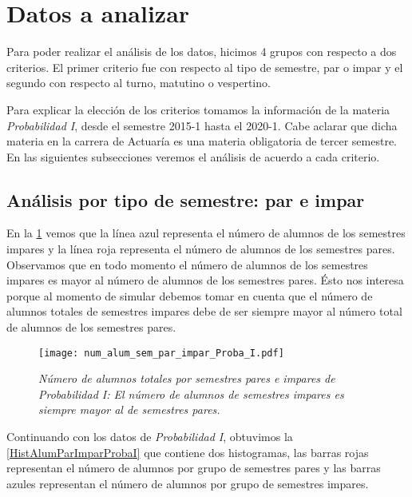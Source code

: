 \section{Datos a analizar} \label{DatosAnalizar}

Para poder realizar el análisis de los datos, hicimos 4 grupos con respecto a dos criterios. El primer criterio fue con respecto al tipo de semestre, par o impar y el segundo con respecto al turno, matutino o vespertino.

Para explicar la elección de los criterios tomamos la información de la materia \textit{Probabilidad I}, desde el semestre 2015-1 hasta el 2020-1. Cabe aclarar que dicha materia en la carrera de Actuaría es una materia obligatoria de tercer semestre. En las siguientes subsecciones veremos el análisis de acuerdo a cada criterio.

\subsection{Análisis por tipo de semestre: par e impar}

En la \figurename{\ref{ParImparProbaI}} vemos que la línea azul representa el número de alumnos de los semestres impares y la línea roja representa el número de alumnos de los semestres pares. Observamos que en todo momento el número de alumnos de los semestres impares es mayor al número de alumnos de los semestres pares. Ésto nos interesa porque al momento de simular debemos tomar en cuenta que el número de alumnos totales de semestres impares debe de ser siempre mayor al número total de alumnos de los semestres pares.

\begin{figure}[H]
\centering
\texttt{[image: num\_alum\_sem\_par\_impar\_Proba\_I.pdf]} %
\caption[\textit{Número de alumnos totales por semestres pares e impares: Probabilidad I}]{\textit{Número de alumnos totales por semestres pares e impares de Probabilidad I: El número de alumnos de semestres impares es siempre mayor al de semestres pares.}}\label{ParImparProbaI}
\end{figure}

Continuando con los datos de \textit{Probabilidad I}, obtuvimos la \figurename{\ref{HistAlumParImparProbaI}} que contiene dos histogramas, las barras rojas representan el número de alumnos por grupo de semestres pares y las barras azules representan el número de alumnos por grupo de semestres impares.


